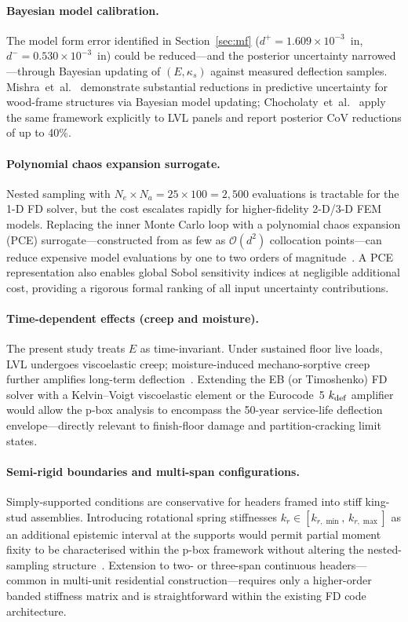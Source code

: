 \documentclass[10pt,twocolumn]{article}
\begin{document}
\paragraph{Bayesian model calibration.}
The model form error identified in Section~\ref{sec:mf}
($d^+ = 1.609\times10^{-3}$~in, $d^- = 0.530\times10^{-3}$~in)
could be reduced---and the posterior uncertainty narrowed---through
Bayesian updating of $(E, \kappa_s)$ against measured deflection
samples.
Mishra~et~al.~\cite{mishra2017} demonstrate substantial reductions in
predictive uncertainty for wood-frame structures via Bayesian model
updating; Chocholaty~et~al.~\cite{chocholaty2023} apply the same
framework explicitly to LVL panels and report posterior CoV
reductions of up to 40\%.

\paragraph{Polynomial chaos expansion surrogate.}
Nested sampling with $N_e \times N_a = 25 \times 100 = 2{,}500$
evaluations is tractable for the 1-D FD solver, but the cost escalates
rapidly for higher-fidelity 2-D/3-D FEM models.
Replacing the inner Monte Carlo loop with a polynomial chaos expansion
(PCE) surrogate---constructed from as few as $\mathcal{O}(d^2)$
collocation points---can reduce expensive model evaluations by one
to two orders of magnitude~\cite{novak2018,lim2023}.
A PCE representation also enables global Sobol sensitivity indices at
negligible additional cost, providing a rigorous formal ranking of all
input uncertainty contributions.

\paragraph{Time-dependent effects (creep and moisture).}
The present study treats $E$ as time-invariant.
Under sustained floor live loads, LVL undergoes viscoelastic creep;
moisture-induced mechano-sorptive creep further amplifies long-term
deflection~\cite{musselman2018,granello2019}.
Extending the EB (or Timoshenko) FD solver with a Kelvin--Voigt
viscoelastic element or the Eurocode~5 $k_{\rm def}$ amplifier
would allow the p-box analysis to encompass the 50-year
service-life deflection envelope---directly relevant to finish-floor
damage and partition-cracking limit states.

\paragraph{Semi-rigid boundaries and multi-span configurations.}
Simply-supported conditions are conservative for headers framed into
stiff king-stud assemblies.
Introducing rotational spring stiffnesses
$k_r \in [k_{r,\min},\,k_{r,\max}]$ as an additional epistemic
interval at the supports would permit partial moment fixity to be
characterised within the p-box framework without altering the
nested-sampling structure~\cite{jiang2018}.
Extension to two- or three-span continuous headers---common in
multi-unit residential construction---requires only a higher-order
banded stiffness matrix and is straightforward within the existing
FD code architecture.
\end{document}
